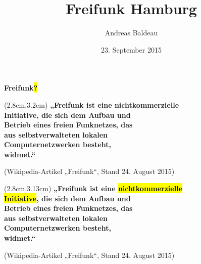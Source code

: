 \documentclass[t]{beamer}
\title{Freifunk Hamburg}
\author{Andreas Baldeau}
\date{23. September 2015}
\begin{document}
\maketitle

\begin{frame}{}
    \vspace{3.4cm}
    \centering \Huge\bf Freifunk\hl{?}
\end{frame}

\begin{frame}{}
    \begin{textblock*}{8.8cm}(2.8cm,3.2cm)
        \Large\bf
        „Freifunk ist eine nicht\-kommerzielle \\
        Initiative, die sich dem Aufbau und \\
        Betrieb eines freien Funknetzes, das \\
        aus selbstverwalteten lokalen \\
        Computer\-netzwerken besteht, \\
        widmet.“
    \end{textblock*}

    \vspace{7cm}
    \hspace{4.1cm}
    {\scriptsize(Wikipedia-Artikel „Freifunk“, Stand 24. August 2015)}
\end{frame}




\begin{frame}{}
    \begin{textblock*}{8.8cm}(2.8cm,3.13cm)
        \Large\bf
        „Freifunk ist eine \hl{\LARGE nicht\-kommerzielle} \\
        \hl{\LARGE Initiative}, die sich dem Aufbau und \\
        Betrieb eines freien Funknetzes, das \\
        aus selbstverwalteten lokalen \\
        Computer\-netzwerken besteht, \\
        widmet.“
    \end{textblock*}

    \vspace{7cm}
    \hspace{4.1cm}
    {\scriptsize(Wikipedia-Artikel „Freifunk“, Stand 24. August 2015)}
\end{frame}
\end{document}
